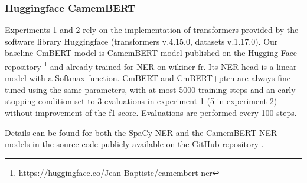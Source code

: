 \subsubsection{Huggingface CamemBERT}
Experiments 1 and 2 rely on the implementation of transformers provided by the software library Huggingface (transformers v.4.15.0, datasets v.1.17.0).
Our baseline CmBERT model is CamemBERT model published on the Hugging Face repository \footnote{\url{https://huggingface.co/Jean-Baptiste/camembert-ner}} and already trained for NER on wikiner-fr.
Its NER head is a linear model with a Softmax function.
CmBERT and CmBERT+ptrn are always fine-tuned using the same parameters, with at most 5000 training steps and an early stopping condition set to 3 evaluations in experiment 1 (5 in experiment 2) without improvement of the f1 score. Evaluations are performed every 100 steps.


Details can be found for both the SpaCy NER and the CamemBERT NER models in the source code publicly available on the GitHub repository .





